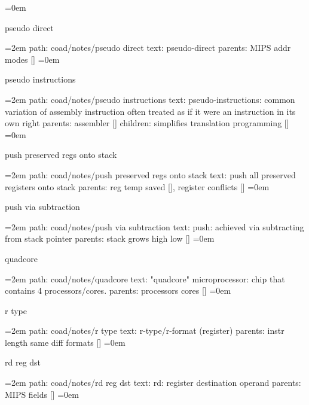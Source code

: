 \smallskip
\leftskip=0em
\par\endgroup
\bigskip
{}
pseudo direct
\smallskip
\par\begingroup
\leftskip=2em
path: coad/notes/pseudo direct
\smallskip
text:  pseudo-direct
\smallskip
parents:  MIPS addr modes []
\smallskip
\leftskip=0em
\par\endgroup
\bigskip
{}
pseudo instructions
\smallskip
\par\begingroup
\leftskip=2em
path: coad/notes/pseudo instructions
\smallskip
text:  pseudo-instructions: common variation of assembly instruction often treated as if it were an instruction in its own right
\smallskip
parents:  assembler []
\smallskip
children: simplifies translation programming []
\smallskip
\leftskip=0em
\par\endgroup
\bigskip
{}
push preserved regs onto stack
\smallskip
\par\begingroup
\leftskip=2em
path: coad/notes/push preserved regs onto stack
\smallskip
text:  push all preserved registers onto stack
\smallskip
parents:  reg temp saved [], register conflicts []
\smallskip
\leftskip=0em
\par\endgroup
\bigskip
{}
push via subtraction
\smallskip
\par\begingroup
\leftskip=2em
path: coad/notes/push via subtraction
\smallskip
text:  push: achieved via subtracting from stack pointer
\smallskip
parents:  stack grows high low []
\smallskip
\leftskip=0em
\par\endgroup
\bigskip
{}
quadcore
\smallskip
\par\begingroup
\leftskip=2em
path: coad/notes/quadcore
\smallskip
text:  "quadcore" microprocessor: chip that contains 4 processors/cores.
\smallskip
parents:  processors cores []
\smallskip
\leftskip=0em
\par\endgroup
\bigskip
{}
r type
\smallskip
\par\begingroup
\leftskip=2em
path: coad/notes/r type
\smallskip
text:  r-type/r-format (register)
\smallskip
parents:  instr length same diff formats []
\smallskip
\leftskip=0em
\par\endgroup
\bigskip
{}
rd reg dst
\smallskip
\par\begingroup
\leftskip=2em
path: coad/notes/rd reg dst
\smallskip
text:  rd: register destination operand
\smallskip
parents:  MIPS fields []
\smallskip
\leftskip=0em
\par\endgroup
